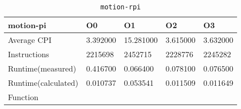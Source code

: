 \begin{table}[ht!]
\centering
\caption{\texttt{motion-rpi}}
\label{tab:motion-rpi}
\begin{tabular}{|l|l|l|l|l|}
\hline
\textbf{motion-pi}	&	\textbf{O0}	&	\textbf{O1}	&	\textbf{O2}	&	\textbf{O3}	\\\hline\hline
Average CPI	&	3.392000	&	15.281000	&	3.615000	&	3.632000	\\\hline
Instructions	&	2215698	&	2452715	&	2228776	&	2245282	\\\hline
Runtime(measured)	&	0.416700	&	0.066400	&	0.078100	&	0.076500	\\\hline
Runtime(calculated)	&	0.010737	&	0.053541	&	0.011509	&	0.011649	\\\hline
Function	&		&		&		&		\\\hline
\end{tabular}
\end{table}
